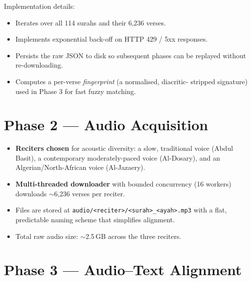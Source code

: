 Implementation details:
\begin{itemize}
  \item Iterates over all 114 surahs and their 6{,}236 verses.
  \item Implements exponential back-off on HTTP 429 / 5xx responses.
  \item Persists the raw JSON to disk so subsequent phases can be replayed
        without re-downloading.
  \item Computes a per-verse \emph{fingerprint} (a normalised, diacritic-
        stripped signature) used in Phase 3 for fast fuzzy matching.
\end{itemize}

\section{Phase 2 --- Audio Acquisition}


\begin{itemize}
  \item \textbf{Reciters chosen} for acoustic diversity: a slow,
        traditional voice (Abdul Basit), a contemporary moderately-paced
        voice (Al-Dosary), and an Algerian/North-African voice
        (Al-Jazaery).
  \item \textbf{Multi-threaded downloader} with bounded concurrency
        (16 workers) downloads $\sim$6{,}236 verses per reciter.
  \item Files are stored at \texttt{audio/<reciter>/<surah>\_<ayah>.mp3}
        with a flat, predictable naming scheme that simplifies alignment.
  \item Total raw audio size: $\sim$2.5\,GB across the three reciters.
\end{itemize}

\section{Phase 3 --- Audio--Text Alignment}


